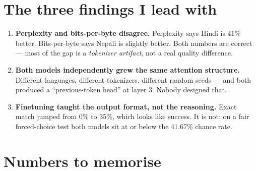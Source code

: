 \documentclass[11pt]{report}
\begin{document}
\section{The three findings I lead with}

\begin{enumerate}[leftmargin=*]
\item \textbf{Perplexity and bits-per-byte disagree.} Perplexity says Hindi is
      41\% better. Bits-per-byte says Nepali is slightly better. Both numbers
      are correct --- most of the gap is a \emph{tokenizer artifact}, not a real
      quality difference.
\item \textbf{Both models independently grew the same attention structure.}
      Different languages, different tokenizers, different random seeds --- and
      both produced a ``previous-token head'' at layer 3. Nobody designed that.
\item \textbf{Finetuning taught the output format, not the reasoning.} Exact
      match jumped from 0\% to 35\%, which looks like success. It is not: on a
      fair forced-choice test both models sit at or below the 41.67\% chance
      rate.
\end{enumerate}

\section{Numbers to memorise}
\end{document}
